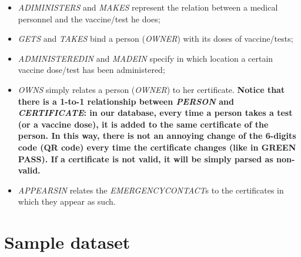 \documentclass{article}
\begin{document}
\begin{itemize}
    \item \textit{ADIMINISTERS} and \textit{MAKES} represent the relation between a medical personnel and the vaccine/test he does;
    \item \textit{GETS} and \textit{TAKES} bind a person (\textit{OWNER}) with its doses of vaccine/tests;
    \item \textit{ADMINISTEREDIN} and \textit{MADEIN} specify in which location a certain vaccine dose/test has been administered;
    \item \textit{OWNS} simply relates a person (\textit{OWNER}) to her certificate. \textbf{Notice that there is a 1-to-1 relationship between \textit{PERSON} and \textit{CERTIFICATE}: in our database, every time a person takes a test (or a vaccine dose), it is added to the same certificate of the person. In this way, there is not an annoying change of the 6-digits code (QR code) every time the certificate changes (like in GREEN PASS). If a certificate is not valid, it will be simply parsed as non-valid.}
    \item \textit{APPEARSIN} relates the \textit{EMERGENCYCONTACT}s to the certificates in which they appear as such.
\end{itemize}
\newpage
\section{Sample dataset}
\end{document}
